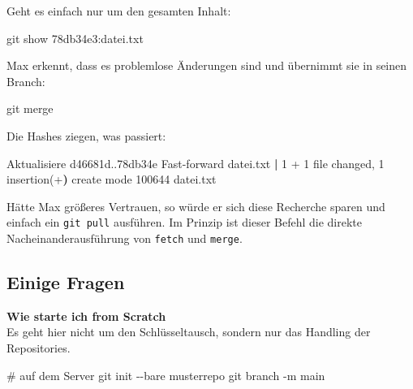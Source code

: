 \documentclass[
  letterpaper,
  DIV=11]{scrreprt}
\newenvironment{Shaded}{\begin{snugshade}}{\end{snugshade}}
\newcommand{\AttributeTok}[1]{\textcolor[rgb]{0.40,0.45,0.13}{#1}}
\newcommand{\CommentTok}[1]{\textcolor[rgb]{0.37,0.37,0.37}{#1}}
\newcommand{\ErrorTok}[1]{\textcolor[rgb]{0.68,0.00,0.00}{#1}}
\newcommand{\ExtensionTok}[1]{\textcolor[rgb]{0.00,0.23,0.31}{#1}}
\newcommand{\FunctionTok}[1]{\textcolor[rgb]{0.28,0.35,0.67}{#1}}
\newcommand{\KeywordTok}[1]{\textcolor[rgb]{0.00,0.23,0.31}{\textbf{#1}}}
\newcommand{\NormalTok}[1]{\textcolor[rgb]{0.00,0.23,0.31}{#1}}
\newcommand{\cmd}[1]{\texttt{#1}\xspace}
\begin{document}
Geht es einfach nur um den gesamten Inhalt:

\begin{Shaded}
\begin{Highlighting}[]
\FunctionTok{git}\NormalTok{ show 78db34e3:datei.txt}
\end{Highlighting}
\end{Shaded}

Max erkennt, dass es problemlose Änderungen sind und übernimmt sie in
seinen Branch:

\begin{Shaded}
\begin{Highlighting}[]
\FunctionTok{git}\NormalTok{ merge}
\end{Highlighting}
\end{Shaded}

Die Hashes ziegen, was passiert:

\begin{Shaded}
\begin{Highlighting}[]
\ExtensionTok{Aktualisiere}\NormalTok{ d46681d..78db34e}
\ExtensionTok{Fast{-}forward}
 \ExtensionTok{datei.txt} \KeywordTok{|} \ExtensionTok{1}\NormalTok{ +}
 \ExtensionTok{1}\NormalTok{ file changed, 1 insertion}\ErrorTok{(}\ExtensionTok{+}\KeywordTok{)}
 \ExtensionTok{create}\NormalTok{ mode 100644 datei.txt}
\end{Highlighting}
\end{Shaded}

Hätte Max größeres Vertrauen, so würde er sich diese Recherche sparen
und einfach ein \cmd{git pull} ausführen. Im Prinzip ist dieser Befehl
die direkte Nacheinanderausführung von \cmd{fetch} und \cmd{merge}.

\subsection{Einige Fragen}\label{einige-fragen}

\textbf{Wie starte ich from Scratch}\\
Es geht hier nicht um den Schlüsseltausch, sondern nur das Handling der
Repositories.

\begin{Shaded}
\begin{Highlighting}[]
\CommentTok{\# auf dem Server }
\FunctionTok{git}\NormalTok{ init }\AttributeTok{{-}{-}bare}\NormalTok{ musterrepo}
\FunctionTok{git}\NormalTok{ branch }\AttributeTok{{-}m}\NormalTok{ main }
\end{Highlighting}
\end{Shaded}
\end{document}
